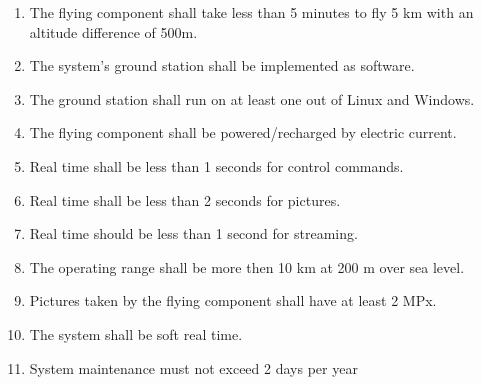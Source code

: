 \begin{enumerate}[label=\bfseries Q \arabic*:]
  \item The flying component shall take less than 5 minutes to fly 5 km with an altitude difference of 500m.
  \item The system's ground station shall be implemented as software.
  \item The ground station shall run on at least one out of Linux and Windows.
  \item The flying component shall be powered/recharged by electric current.
  \item Real time shall be less than 1 seconds for control commands.
  \item Real time shall be less than 2 seconds for pictures.
  \item Real time should be less than 1 second for streaming.
  \item The operating range shall be more then 10 km at 200 m over sea level.
  \item Pictures taken by the flying component shall have at least 2 MPx.
  \item The system shall be soft real time.
  \item System maintenance must not exceed 2 days per year
\end{enumerate}